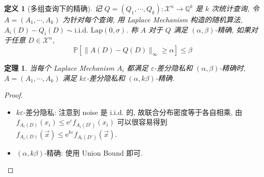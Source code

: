 \documentclass[8pt]{article}
\theoremstyle{compact}
\newtheorem{theorem}{定理}[section]
\newtheorem{definition}{定义}[section]
\def\le{\leqslant}
\def\ge{\geqslant}
\def\P#1{\mathbb{P}\left[{#1}\right]}
\def\e{\mathrm{e}}
\begin{document}
\begin{definition}[多组查询下的精确]
	记 $Q = (Q_1, \cdots, Q_k): \mathcal X^n \to \mathbb Q^k$ 是 $k$ 次统计查询, 令 $A = (A_1, \cdots, A_k)$ 为针对每个查询, 用 Laplace Mechanism 构造的随机算法, $A_i(D) - Q_i(D) \sim \text{i.i.d. } \text{Lap}(0, \sigma)$. 称 $A$ 对于 $Q$ 满足 $(\alpha, \beta)$-精确, 如果对于任意 $D \in \mathcal X^n$, $$\P{\|A(D) - Q(D)\|_{\infty} \ge \alpha} \le \beta$$
\end{definition}
\begin{theorem}
	当每个 Laplace Mechanism $A_i$ 都满足 $\varepsilon$-差分隐私和 $(\alpha, \beta)$-精确时, $A = (A_1, \cdots, A_k)$ 满足 $k\varepsilon$-差分隐私和 $(\alpha, k\beta)$-精确.
\end{theorem}
\begin{proof}
	\begin{itemize}
		\item $k\varepsilon$-差分隐私: 注意到 noise 是 i.i.d. 的, 故联合分布密度等于各自相乘, 由 $f_{A_i(D)}(x_i) \le \e^{\varepsilon}f_{A_i(D')}(x_i)$ 可以很容易得到 $f_{A_i(D)}(\vec x) \le \e^{k\varepsilon} f_{A_i(D')}(\vec x)$.
	    \item $(\alpha, k\beta)$-精确: 使用 Union Bound 即可.
	\end{itemize}
	
\end{proof}
\end{document}

